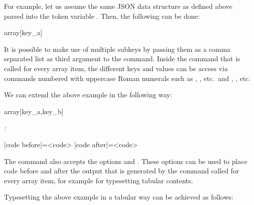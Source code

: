 \documentclass[a4paper]{article}
\begin{document}
{{For example, let us assume the same JSON data structure as defined above parsed into the token variable \macro{\myJSONdata}. Then, the following can be done:

\begin{codeexamplecolumns}
\newcommand{\myJSONitem}{
  \item \emph{\JSONParseArrayValue}
}

\begin{itemize}
  \JSONParseArrayMapFunction{\myJSONdata}
    {array}[key_a]{\myJSONitem}
\end{itemize}
\end{codeexamplecolumns}

It is possible to make use of multiple subkeys by passing them as a comma separated list as third argument to the command. Inside the command that is called for every array item, the different keys and values can be access via commands numbered with uppercase Roman numerals such as \macro{\JSONParseArrayKeyI}, \macro{\JSONParseArrayKeyII}, \macro{\JSONParseArrayKeyIII} etc.\ and \macro{\JSONParseArrayValueI}, \macro{\JSONParseArrayValueII}, \macro{\JSONParseArrayValueIII} etc.

We can extend the above example in the following way:

\begin{codeexamplecolumns}
\newcommand{\myJSONitem}{
  \item \emph{\JSONParseArrayValueI :}
    \JSONParseArrayValueII
}

\begin{itemize}
  \JSONParseArrayMapFunction{\myJSONdata}
    {array}[key_a,key_b]{\myJSONitem}
\end{itemize}
\end{codeexamplecolumns}

\begin{macrodef}
|code before|={<code>}
|code after|={<code>}
\end{macrodef}

The \macro{\JSONParseArrayMapFunction} command also accepts the options  and . These options can be used to place code before and after the output that is generated by the command called for every array item, for example for typesetting tabular contents.

Typesetting the above example in a tabular way can be achieved as follows:

\begin{codeexamplecolumns}
\newcommand{\myJSONitem}{
  \JSONParseArrayValueI &
  \JSONParseArrayValueII \\
}


\end{codeexamplecolumns}}}
\end{document}
